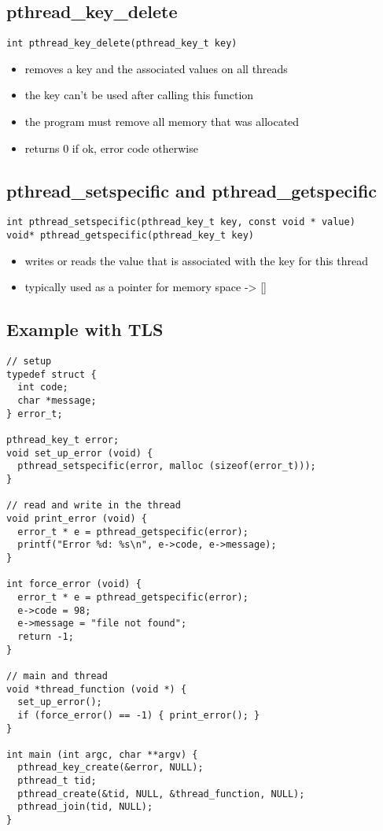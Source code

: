 \documentclass[main.tex,fontsize=8pt,paper=a4,paper=portrait,DIV=calc,]{scrartcl}
\begin{document}
\subsection{pthread\_key\_delete}
\begin{lstlisting}
int pthread_key_delete(pthread_key_t key)
\end{lstlisting}
\begin{itemize}
\item \textcolor{black}{removes a key and the associated values on all threads}
\item \textcolor{black}{the key can't be used after calling this function}
\item \textcolor{black}{the program must remove all memory that was allocated}
\item \textcolor{black}{returns 0 if ok, error code otherwise}
\end{itemize} 

\subsection{pthread\_setspecific and pthread\_getspecific}
\begin{lstlisting}
int pthread_setspecific(pthread_key_t key, const void * value)
void* pthread_getspecific(pthread_key_t key)
\end{lstlisting}
\begin{itemize}
\item \textcolor{black}{writes or reads the value that is associated with the key for this thread}
\item \textcolor{black}{typically used as a pointer for memory space -> []}
\end{itemize} 

\subsection{Example with TLS}
\begin{lstlisting}
// setup 
typedef struct {
  int code;
  char *message;
} error_t;

pthread_key_t error;
void set_up_error (void) {
  pthread_setspecific(error, malloc (sizeof(error_t)));
}

// read and write in the thread
void print_error (void) {
  error_t * e = pthread_getspecific(error);
  printf("Error %d: %s\n", e->code, e->message);
}

int force_error (void) {
  error_t * e = pthread_getspecific(error);
  e->code = 98;
  e->message = "file not found";
  return -1;
}

// main and thread
void *thread_function (void *) {
  set_up_error();
  if (force_error() == -1) { print_error(); }
}

int main (int argc, char **argv) {
  pthread_key_create(&error, NULL);
  pthread_t tid;
  pthread_create(&tid, NULL, &thread_function, NULL);
  pthread_join(tid, NULL);
}
\end{lstlisting}
\end{document}
